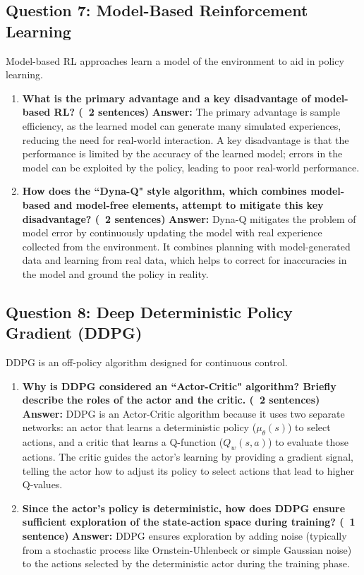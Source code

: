 \documentclass[12pt]{article}
\begin{document}
\subsection*{Question 7: Model-Based Reinforcement Learning}
Model-based RL approaches learn a model of the environment to aid in policy learning.
\begin{enumerate}
    \item \textbf{What is the primary advantage and a key disadvantage of model-based RL? (~2 sentences)}
    \textbf{Answer:} The primary advantage is sample efficiency, as the learned model can generate many simulated experiences, reducing the need for real-world interaction. A key disadvantage is that the performance is limited by the accuracy of the learned model; errors in the model can be exploited by the policy, leading to poor real-world performance.
    \item \textbf{How does the ``Dyna-Q" style algorithm, which combines model-based and model-free elements, attempt to mitigate this key disadvantage? (~2 sentences)}
    \textbf{Answer:} Dyna-Q mitigates the problem of model error by continuously updating the model with real experience collected from the environment. It combines planning with model-generated data and learning from real data, which helps to correct for inaccuracies in the model and ground the policy in reality.
\end{enumerate}

\subsection*{Question 8: Deep Deterministic Policy Gradient (DDPG)}
DDPG is an off-policy algorithm designed for continuous control.
\begin{enumerate}
    \item \textbf{Why is DDPG considered an ``Actor-Critic" algorithm? Briefly describe the roles of the actor and the critic. (~2 sentences)}
    \textbf{Answer:} DDPG is an Actor-Critic algorithm because it uses two separate networks: an actor that learns a deterministic policy ($\mu_\theta(s)$) to select actions, and a critic that learns a Q-function ($Q_w(s,a)$) to evaluate those actions. The critic guides the actor's learning by providing a gradient signal, telling the actor how to adjust its policy to select actions that lead to higher Q-values.
    \item \textbf{Since the actor's policy is deterministic, how does DDPG ensure sufficient exploration of the state-action space during training? (~1 sentence)}
    \textbf{Answer:} DDPG ensures exploration by adding noise (typically from a stochastic process like Ornstein-Uhlenbeck or simple Gaussian noise) to the actions selected by the deterministic actor during the training phase.
\end{enumerate}
\end{document}
